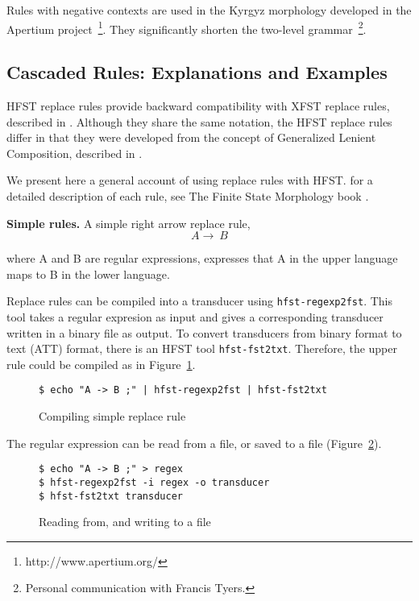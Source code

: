 \documentclass{llncs}
\begin{document}
Rules with negative contexts are used in the Kyrgyz morphology
developed in the Apertium project~\footnote{http://www.apertium.org/}.
They significantly shorten the two-level
grammar~\footnote{Personal communication with Francis Tyers.}.

\subsection{Cascaded Rules: Explanations and Examples}

HFST replace rules provide backward compatibility with XFST replace rules, 
described in \cite{Kempe96parallelreplacement}\cite{beesley/2003}. 
Although they share the same notation, the HFST replace rules differ in that
they were developed from the concept of Generalized Lenient Composition, 
described in \cite{ylijyra/2008b}.

We present here a general account of using replace rules with HFST.
for a detailed description of each rule, see
The Finite State Morphology book \cite{beesley/2003}.


\textbf{Simple rules.} A simple right arrow replace rule,
\begin{equation}
  A \rightarrow\ B
\end{equation}

where A and B are regular expressions, 
expresses that A in the upper language maps to B in the lower language.

Replace rules can be compiled into a transducer using
\verb!hfst-regexp2fst!. This tool takes a regular expresion as input 
and gives a corresponding transducer written in a binary file as output. 
To convert transducers from binary format to text (ATT) format, 
there is an HFST tool \verb!hfst-fst2txt!. Therefore, the upper rule 
could be compiled as in Figure~\ref{fig:simple_replace}.

\begin{figure} [h!]
{\scriptsize
\begin{verbatim}
$ echo "A -> B ;" | hfst-regexp2fst | hfst-fst2txt
\end{verbatim}
}
\caption{Compiling simple replace rule}
\label{fig:simple_replace}
\end{figure}


The regular expression can be read from a file, or saved to a file (Figure~\ref{fig:read_from_file}). 

\begin{figure} [h!]
{\scriptsize
\begin{verbatim}
$ echo "A -> B ;" > regex
$ hfst-regexp2fst -i regex -o transducer
$ hfst-fst2txt transducer
\end{verbatim}
}
\caption{Reading from, and writing to a file}
\label{fig:read_from_file}
\end{figure}
\end{document}
